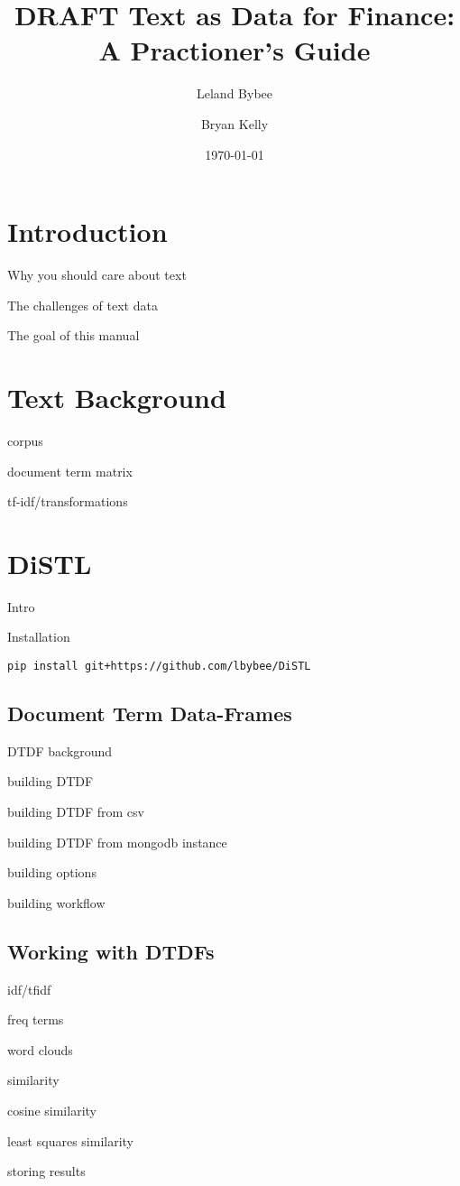 \documentclass{article}
\begin{document}
\title{\textbf{DRAFT} Text as Data for Finance: A Practioner's Guide}

\date{\today}

\author{Leland Bybee \and Bryan Kelly}

\maketitle


\tableofcontents

\section{Introduction}

Why you should care about text

The challenges of text data

The goal of this manual

\section{Text Background}

corpus

document term matrix

tf-idf/transformations

\section{DiSTL}

Intro

Installation

\begin{verbatim}
pip install git+https://github.com/lbybee/DiSTL
\end{verbatim}

\subsection{Document Term Data-Frames}

DTDF background

building DTDF

building DTDF from csv

building DTDF from mongodb instance

building options

building workflow

\subsection{Working with DTDFs}

idf/tfidf

freq terms

word clouds

similarity

cosine similarity

least squares similarity

storing results
\end{document}
